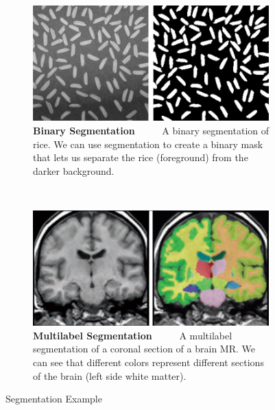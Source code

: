 \documentclass[10pt]{article}
\begin{document}
\begin{figure}[h]
	\centering
	\begin{subfigure}[h]{0.45\textwidth}
		\includegraphics[width=\textwidth]{figures/segmentation0.jpg}
		\caption{\footnotesize \textbf{Binary Segmentation} \ \ \ \ \ A binary segmentation of rice.  We can use segmentation to create a binary mask that lets us separate the rice (foreground) from the darker background. \footnotemark[1]}
	\end{subfigure}
	~
	\begin{subfigure}[h]{0.45\textwidth}
		\includegraphics[width=\textwidth]{figures/segmentation1.jpg}
		\caption{\footnotesize \textbf{Multilabel Segmentation} \ \ \ \ \ A multilabel segmentation of a coronal section of a brain MR.  We can see that different colors represent different sections of the brain (left side white matter). \footnotemark[2]}
	\end{subfigure}
	\caption{Segmentation Example}
	\label{fig:segmentation}
\end{figure}\\
\end{document}
